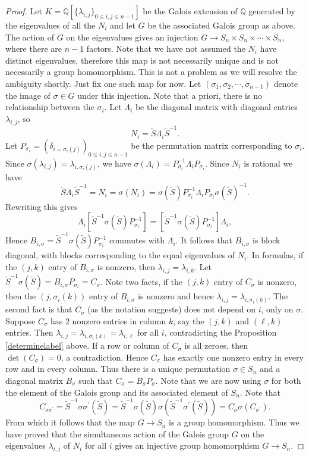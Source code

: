 \documentclass[12pt,psamsfonts]{amsart}
\numberwithin{equation}{section}
\theoremstyle{definition}
\begin{document}
\begin{proof}

Let $K={\mathbb Q}[\{\lambda_{i,j}\}_{0\le i,j\le n-1}]$ be the
Galois extension of ${\mathbb Q}$ generated by the eigenvalues of
all the $N_i$ and let $G$ be the associated Galois group as above.
The action of $G$ on the eigenvalues gives an injection $G\to
S_{n}\times S_{n}\times \cdots \times S_{n}$, where there are
$n-1$ factors. Note that we have not assumed the $N_i$ have
distinct eigenvalues, therefore this map is not necessarily unique
and is not necessarily a group homomorphism. This is not a problem
as we will resolve the ambiguity shortly. Just fix one such map
for now. Let $(\sigma_1,\sigma_2,\cdots, \sigma_{n-1})$ denote the
image of $\sigma\in G$ under this injection. Note that a priori,
there is no relationship between the $\sigma_i$. Let $\Lambda_i$
be the diagonal matrix with diagonal entries $\lambda_{i,j}$, so
$$N_i=\tilde S \Lambda_i \tilde
S^{-1}.$$ Let $P_{\sigma_i}=(\delta_{i=\sigma_i(j)})_{0\le i,j\le
n-1}$ be the permutation matrix corresponding to $\sigma_i$. Since
$\sigma(\lambda_{i,j})=\lambda_{i,\sigma_i(j)}$, we have
$\sigma(\Lambda_i)=P_{\sigma_i}^{-1} \Lambda_i P_{\sigma_i}$.
Since $N_i$ is rational we have
$$\tilde S \Lambda_i \tilde S^{-1} = N_i =\sigma(N_i) = \sigma(\tilde S)
P_{\sigma_i}^{-1} \Lambda_i P_{\sigma_i} \sigma(\tilde S)^{-1}.$$
Rewriting this gives
$$\Lambda_i [\tilde S^{-1} \sigma(\tilde S) P_{\sigma_i}^{-1}]=
[\tilde S^{-1} \sigma(\tilde S) P_{\sigma_i}^{-1}] \Lambda_i ,$$
Hence $B_{i,\sigma}=\tilde S^{-1} \sigma(\tilde S)
P_{\sigma_i}^{-1}$ commutes with $\Lambda_i$. It follows that
$B_{i,\sigma}$ is block diagonal, with blocks  corresponding to
the equal eigenvalues of $N_i$. In formulas, if the $(j,k)$ entry
of $B_{i,\sigma}$ is nonzero, then $\lambda_{i,j}=\lambda_{i,k}$.
Let $\tilde S^{-1} \sigma(\tilde S) = B_{i,\sigma} P_{\sigma_i} =
C_{\sigma}$. Note two facts, if the $(j,k)$ entry of $C_{\sigma}$
is nonzero, then the $(j,\sigma_i(k))$ entry of $B_{i,\sigma}$ is
nonzero and hence $\lambda_{i,j}=\lambda_{i,\sigma_i(k)}$. The
second fact is that $C_{\sigma}$ (as the notation suggests) does
not depend on $i$, only on $\sigma$. Suppose $C_{\sigma}$ has 2
nonzero entries in column $k$, say the $(j,k)$ and $(\ell,k)$
entries. Then
$\lambda_{i,j}=\lambda_{i,\sigma_i(k)}=\lambda_{i,\ell}$ for all
$i$, contradicting the Proposition \ref{determinelabel} above. If
a row or column of $C_{\sigma}$ is all zeroes, then
$\det(C_{\sigma})=0$, a contradiction. Hence $C_{\sigma}$ has
exactly one nonzero entry in every row and in every column. Thus
there is a unique permutation $\sigma\in S_n$ and a diagonal
matrix $B_{\sigma}$ such that $C_{\sigma}=B_{\sigma} P_{\sigma}$.
Note that we are now using $\sigma$ for both the element of the
Galois group and its associated element of $S_n$. Note that
$$C_{\sigma \sigma^{\prime}} =\tilde S^{-1} \sigma \sigma^{\prime}(\tilde
S) = \tilde S^{-1} \sigma(\tilde S) \sigma(\tilde S^{-1}
\sigma^{\prime}(\tilde S)) = C_{\sigma}
\sigma(C_{\sigma^{\prime}}).$$ From which it follows that the map
$G\to S_{n}$ is a group homomorphism. Thus we have proved that the
simultaneous action of the Galois group $G$ on the eigenvalues
$\lambda_{i,j}$ of $N_i$ for all $i$ gives an injective group
homomorphism $G\to S_{n}$.


\end{proof}
\end{document}
